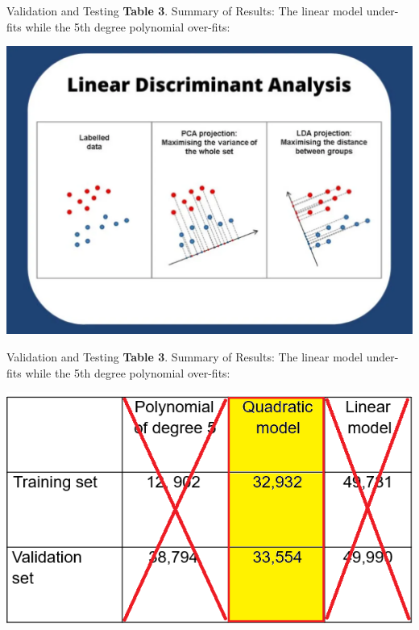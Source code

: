 \documentclass[11pt]{beamer}
\begin{document}
\begin{frame}{Validation and Testing}
\textbf{Table 3}. Summary of Results: The linear model under-fits while the 5th degree polynomial over-fits:
	\begin{center}
	\includegraphics[scale=.6]{../05-pictures/lesson-2-2_pic_8.png}
	\end{center}
\end{frame}
\begin{frame}{Validation and Testing}
\textbf{Table 3}. Summary of Results: The linear model under-fits while the 5th degree polynomial over-fits:
	\begin{center}
	\includegraphics[scale=.6]{../05-pictures/lesson-2-2_pic_9.png}
	\end{center}
\end{frame}
\end{document}
